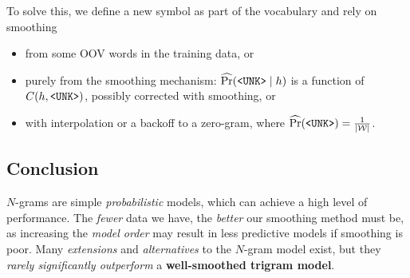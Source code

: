 To solve this, we define a new symbol \unktoken{} as part of the vocabulary and rely on smoothing
\begin{itemize}
	\item from some OOV words in the training data, or
	\item purely from the smoothing mechanism: \(\operatorname{\widehat{\Pr}}(\texttt{<UNK>} \mid h)\) is a function of \(C(h, \texttt{<UNK>})\), possibly corrected with smoothing, or
	\item with interpolation or a backoff to a zero-gram, where \(\operatorname{\widehat{\Pr}}(\texttt{<UNK>}) = \frac{1}{{\left\lvert\mathcal{W}\right\lvert}}\).
\end{itemize}

\subsection{Conclusion}
\(N\)-grams are simple \emph{probabilistic} models, which can achieve a high level of performance.
The \emph{fewer} data we have, the \emph{better} our smoothing method must be, as increasing the \emph{model order} may result in less predictive models if smoothing is poor.
Many \emph{extensions} and \emph{alternatives} to the \(N\)-gram model exist, but they \emph{rarely significantly outperform} a \textbf{well-smoothed trigram model}.